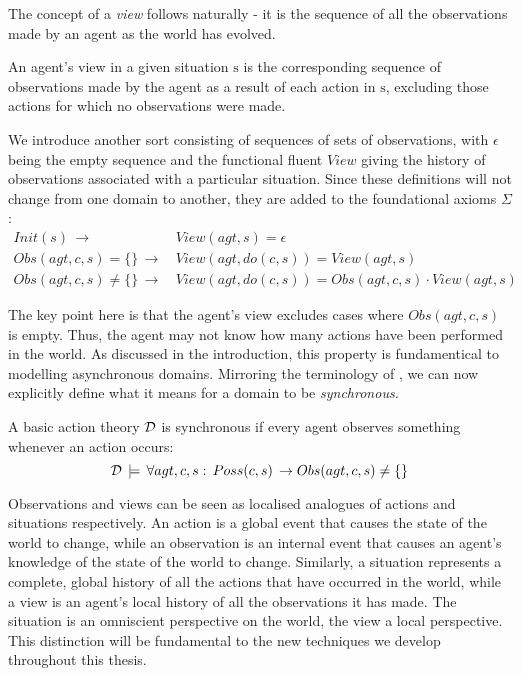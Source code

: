The concept of a \emph{view} follows naturally - it is the sequence
of all the observations made by an agent as the world has evolved.

\begin{defnL}
[{Views}] An agent's view in a given situation $\mathrm{s}$
is the corresponding sequence of observations made by the agent as
a result of each action in $\mathrm{s}$, excluding those actions
for which no observations were made. 
\end{defnL}
We introduce another sort  consisting of sequences of sets
of observations, with $\epsilon$ being the empty sequence and the
functional fluent $View$ giving the history of observations associated
with a particular situation. Since these definitions will not change
from one domain to another, they are added to the foundational axioms
$\Sigma$:\begin{align}
Init(s)\,\rightarrow & \, View(agt,s)=\epsilon\nonumber \\
Obs(agt,c,s)=\{\}\,\rightarrow & \, View(agt,do(c,s))=View(agt,s)\nonumber \\
Obs(agt,c,s)\neq\{\}\,\rightarrow & \, View(agt,do(c,s))=Obs(agt,c,s)\cdot View(agt,s)\label{eq:view_defn}\end{align}


The key point here is that the agent's view excludes cases where $Obs(agt,c,s)$
is empty. Thus, the agent may not know how many actions have been
performed in the world. As discussed in the introduction, this property
is fundamentical to modelling asynchronous domains. Mirroring the
terminology of \citet{vanBentham06tree_of_knowledge}, we can now
explicitly define what it means for a domain to be \emph{synchronous.}

\begin{defnL}
 A basic action theory $\mathcal{D}$
is synchronous if every agent observes something whenever an action
occurs:\[
\mathcal{D}\,\models\,\forall agt,c,s:\, Poss(c,s)\,\rightarrow Obs(agt,c,s)\neq\{\}\]

\end{defnL}
Observations and views can be seen as localised analogues of actions
and situations respectively. An action is a global event that causes
the state of the world to change, while an observation is an internal
event that causes an agent's knowledge of the state of the world to
change. Similarly, a situation represents a complete, global history
of all the actions that have occurred in the world, while a view is
an agent's local history of all the observations it has made. The
situation is an omniscient perspective on the world, the view a local
perspective. This distinction will be fundamental to the new techniques
we develop throughout this thesis.

